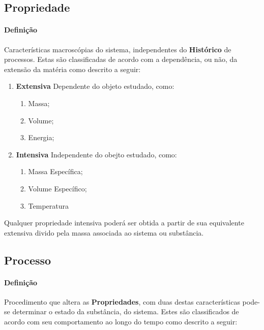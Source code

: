 \documentclass{article}
\begin{document}
        \subsection{Propriedade}
            \paragraph{Definição}Características macroscópias do sistema, independentes do \textbf{Histórico} de processos. Estas são classificadas de acordo com a dependência, ou não, da extensão da matéria como descrito a seguir:
                \begin{enumerate}[noitemsep]
                    \item \textbf{Extensiva} Dependente do objeto estudado, como:
                        \begin{enumerate}[noitemsep]
                            \item Massa;
                            \item Volume;
                            \item Energia;
                        \end{enumerate}
                    \item \textbf{Intensiva} Independente do obejto estudado, como:
                        \begin{enumerate}[noitemsep]
                            \item Massa Específica;
                            \item Volume Específico;
                            \item Temperatura
                        \end{enumerate}
                \end{enumerate}
            Qualquer propriedade intensiva poderá ser obtida a partir de sua equivalente extensiva divido pela massa associada ao sistema ou substância.

        \subsection{Processo}
            \paragraph{Definição}Procedimento que altera as \textbf{Propriedades}, com duas destas características pode-se determinar o estado da substância, do sistema. Estes são classificados de acordo com seu comportamento ao longo do tempo como descrito a seguir:
\end{document}
